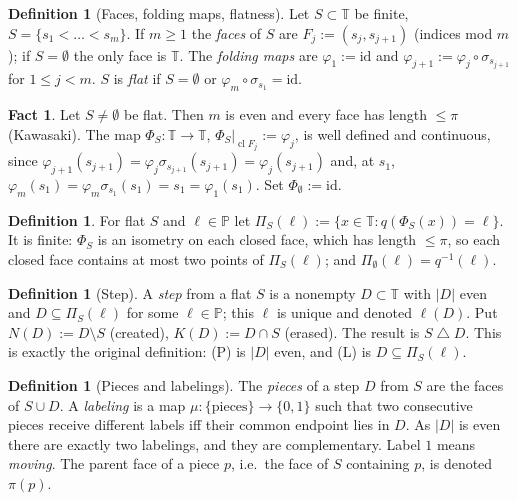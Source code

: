 \documentclass[11pt]{amsart}
\theoremstyle{definition}
\newtheorem{definition}[theorem]{Definition}
\newtheorem{fact}[theorem]{Fact}
\theoremstyle{remark}
\newcommand{\T}{\mathbb{T}}
\newcommand{\Pl}{\mathbb{P}}
\newcommand{\arc}[2]{(#1,#2)}
\newcommand{\cl}{\operatorname{cl}}
\begin{document}
\begin{definition}[Faces, folding maps, flatness]\label{def:flat}
Let $S\subset\T$ be finite, $S=\{s_1<\dots<s_m\}$. If $m\ge1$ the \emph{faces} of $S$ are
$F_j:=\arc{s_j}{s_{j+1}}$ (indices mod $m$); if $S=\emptyset$ the only face is $\T$.
The \emph{folding maps} are $\varphi_1:=\mathrm{id}$ and
$\varphi_{j+1}:=\varphi_j\circ\sigma_{s_{j+1}}$ for $1\le j<m$.
$S$ is \emph{flat} if $S=\emptyset$ or $\varphi_m\circ\sigma_{s_1}=\mathrm{id}$.
\end{definition}

\begin{fact}\label{fact:Phi}
Let $S\ne\emptyset$ be flat. Then $m$ is even and every face has length $\le\pi$ (Kawasaki).
The map $\Phi_S\colon\T\to\T$, $\Phi_S|_{\cl F_j}:=\varphi_j$, is well defined and continuous,
since $\varphi_{j+1}(s_{j+1})=\varphi_j\sigma_{s_{j+1}}(s_{j+1})=\varphi_j(s_{j+1})$ and,
at $s_1$, $\varphi_m(s_1)=\varphi_m\sigma_{s_1}(s_1)=s_1=\varphi_1(s_1)$.
Set $\Phi_\emptyset:=\mathrm{id}$.
\end{fact}

\begin{definition}\label{def:Pi}
For flat $S$ and $\ell\in\Pl$ let $\Pi_S(\ell):=\{x\in\T : q(\Phi_S(x))=\ell\}$.
It is finite: $\Phi_S$ is an isometry on each closed face, which has length $\le\pi$, so each
closed face contains at most two points of $\Pi_S(\ell)$; and $\Pi_\emptyset(\ell)=q^{-1}(\ell)$.
\end{definition}

\begin{definition}[Step]\label{def:step}
A \emph{step} from a flat $S$ is a nonempty $D\subset\T$ with $|D|$ even and
$D\subseteq\Pi_S(\ell)$ for some $\ell\in\Pl$; this $\ell$ is unique and denoted $\ell(D)$.
Put $N(D):=D\setminus S$ (created), $K(D):=D\cap S$ (erased). The result is $S\mathbin{\triangle}D$.
This is exactly the original definition: (P) is $|D|$ even, and (L) is $D\subseteq\Pi_S(\ell)$.
\end{definition}

\begin{definition}[Pieces and labelings]\label{def:label}
The \emph{pieces} of a step $D$ from $S$ are the faces of $S\cup D$. A \emph{labeling} is a map
$\mu\colon\{\text{pieces}\}\to\{0,1\}$ such that two consecutive pieces receive different labels
iff their common endpoint lies in $D$. As $|D|$ is even there are exactly two labelings, and
they are complementary. Label $1$ means \emph{moving}. The parent face of a piece $p$, i.e.\ the
face of $S$ containing $p$, is denoted $\pi(p)$.
\end{definition}
\end{document}
